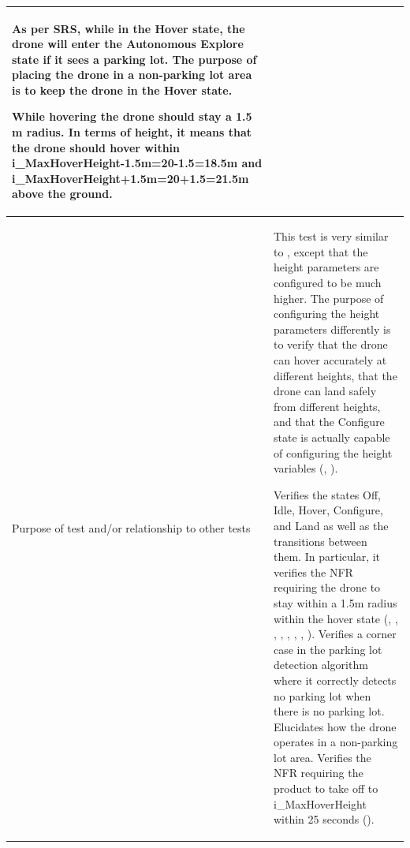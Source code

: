 \documentclass[12pt, titlepage]{article}
\begin{document}
\begin{table}[!h]
\begin{center}
\begin{tabular}{ | m{1.5cm} | m{15cm} | }
As per SRS, while in the Hover state, the drone will enter the Autonomous Explore state if it sees a parking lot. The purpose of placing the drone in a non-parking lot area is to keep the drone in the Hover state.

While hovering the drone should stay a 1.5 m radius. In terms of height, it means that the drone should hover within i\_MaxHoverHeight-1.5m=20-1.5=18.5m and i\_MaxHoverHeight+1.5m=20+1.5=21.5m above the ground.  \\ 
\hline
Purpose of test and/or relationship to other tests & This test is very similar to \nameref{tab:STC_001}, except that the height parameters are configured to be much higher. The purpose of configuring the height parameters differently is to verify that the drone can hover accurately at different heights, that the drone can land safely from different heights, and that the Configure state is actually capable of configuring the height variables (\nameref{GEN_003}, \nameref{GEN_004}).

Verifies the states Off, Idle, Hover, Configure, and Land as well as the transitions between them. In particular, it verifies the NFR requiring the drone to stay within a 1.5m radius within the hover state (\nameref{STA_000}, \nameref{STA_001}, \nameref{STA_004}, \nameref{STA_005}, \nameref{STA_006}, \nameref{TRANS_002}, \nameref{TRANS_003}, \nameref{TRANS_009}). 
Verifies a corner case in the parking lot detection algorithm where it correctly detects no parking lot when there is no parking lot.
Elucidates how the drone operates in a non-parking lot area.
Verifies the NFR requiring the product to take off to i\_MaxHoverHeight within 25 seconds (\nameref{PERF_002}). \\ 
\hline
\end{tabular}
\end{center}
\end{table}
\end{document}
